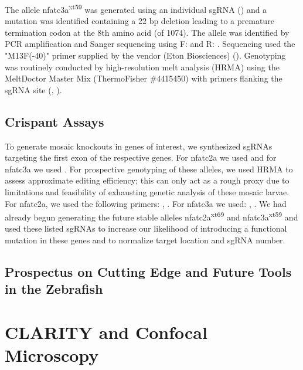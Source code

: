 The allele nfatc3a\textsuperscript{xt59} was generated using an individual sgRNA () and a mutation was identified containing a 22 bp deletion leading to a premature termination codon at the 8th amino acid (of 1074). The allele was identified by PCR amplification and Sanger sequencing using F:  and R: . Sequencing used the "M13F(-40)" primer supplied by the vendor (Eton Biosciences) (). Genotyping was routinely conducted by high-resolution melt analysis (HRMA) using the MeltDoctor Master Mix (ThermoFisher \#4415450) with primers flanking the sgRNA site (, ). 

\subsection{Crispant Assays}

To generate mosaic knockouts in genes of interest, we synthesized sgRNAs targeting the first exon of the respective genes. For nfatc2a we used  and for nfatc3a we used . For prospective genotyping of these alleles, we used HRMA to assess approximate editing efficiency; this can only act as a rough proxy due to limitations and feasibility of exhausting genetic analysis of these mosaic larvae. For nfatc2a, we used the following primers: , . For nfatc3a we used: , . We had already begun generating the future stable alleles nfatc2a\textsuperscript{xt69} and nfatc3a\textsuperscript{xt59} and used these listed sgRNAs to increase our likelihood of introducing a functional mutation in these genes and to normalize target location and sgRNA number.

\subsection{Prospectus on Cutting Edge and Future Tools in the Zebrafish}\label{newtech}

\section{CLARITY and Confocal Microscopy}

